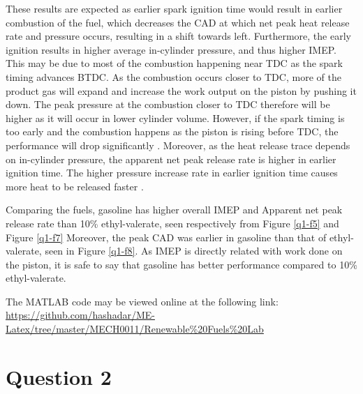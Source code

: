 \documentclass[11pt]{article}
\begin{document}
These results are expected as earlier spark ignition time would result in earlier combustion of the fuel, which decreases the CAD at which net peak heat release rate and pressure occurs, resulting in a shift towards left. Furthermore, the early ignition results in higher average in-cylinder pressure, and thus higher IMEP. This may be due to most of the combustion happening near TDC as the spark timing advances BTDC. As the combustion occurs closer to TDC, more of the product gas will expand and increase the work output on the piston by pushing it down. The peak pressure at the combustion closer to TDC therefore will be higher as it will occur in lower cylinder volume. However, if the spark timing is too early and the combustion happens as the piston is rising before TDC, the performance will drop significantly \cite{q1-r1}. Moreover, as the heat release trace depends on in-cylinder pressure, the apparent net peak release rate is higher in earlier ignition time. The higher pressure increase rate in earlier ignition time causes more heat to be released faster \cite{q1-r2}. 

Comparing the fuels, gasoline has higher overall IMEP and Apparent net peak release rate than 10\% ethyl-valerate, seen respectively from Figure \ref{q1-f5} and Figure \ref{q1-f7} Moreover, the peak CAD was earlier in gasoline than that of ethyl-valerate, seen in Figure \ref{q1-f8}. As IMEP is directly related with work done on the piston, it is safe to say that gasoline has better performance compared to 10\% ethyl-valerate. 

The MATLAB code may be viewed online at the following link: \url{https://github.com/hashadar/ME-Latex/tree/master/MECH0011/Renewable%20Fuels%20Lab}
\section{Question 2}
\end{document}
